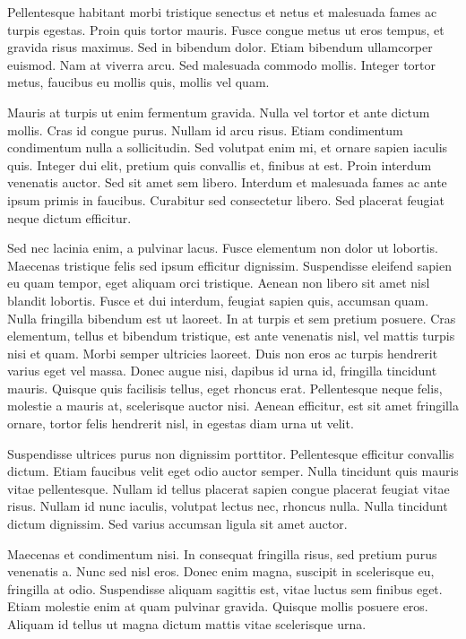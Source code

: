 Pellentesque habitant morbi tristique senectus et netus et malesuada fames ac turpis egestas. Proin quis tortor mauris. Fusce congue metus ut eros tempus, et gravida risus maximus. Sed in bibendum dolor. Etiam bibendum ullamcorper euismod. Nam at viverra arcu. Sed malesuada commodo mollis. Integer tortor metus, faucibus eu mollis quis, mollis vel quam.

Mauris at turpis ut enim fermentum gravida. Nulla vel tortor et ante dictum mollis. Cras id congue purus. Nullam id arcu risus. Etiam condimentum condimentum nulla a sollicitudin. Sed volutpat enim mi, et ornare sapien iaculis quis. Integer dui elit, pretium quis convallis et, finibus at est. Proin interdum venenatis auctor. Sed sit amet sem libero. Interdum et malesuada fames ac ante ipsum primis in faucibus. Curabitur sed consectetur libero. Sed placerat feugiat neque dictum efficitur.

Sed nec lacinia enim, a pulvinar lacus. Fusce elementum non dolor ut lobortis. Maecenas tristique felis sed ipsum efficitur dignissim. Suspendisse eleifend sapien eu quam tempor, eget aliquam orci tristique. Aenean non libero sit amet nisl blandit lobortis. Fusce et dui interdum, feugiat sapien quis, accumsan quam. Nulla fringilla bibendum est ut laoreet. In at turpis et sem pretium posuere. Cras elementum, tellus et bibendum tristique, est ante venenatis nisl, vel mattis turpis nisi et quam. Morbi semper ultricies laoreet. Duis non eros ac turpis hendrerit varius eget vel massa. Donec augue nisi, dapibus id urna id, fringilla tincidunt mauris. Quisque quis facilisis tellus, eget rhoncus erat. Pellentesque neque felis, molestie a mauris at, scelerisque auctor nisi. Aenean efficitur, est sit amet fringilla ornare, tortor felis hendrerit nisl, in egestas diam urna ut velit.

Suspendisse ultrices purus non dignissim porttitor. Pellentesque efficitur convallis dictum. Etiam faucibus velit eget odio auctor semper. Nulla tincidunt quis mauris vitae pellentesque. Nullam id tellus placerat sapien congue placerat feugiat vitae risus. Nullam id nunc iaculis, volutpat lectus nec, rhoncus nulla. Nulla tincidunt dictum dignissim. Sed varius accumsan ligula sit amet auctor.

Maecenas et condimentum nisi. In consequat fringilla risus, sed pretium purus venenatis a. Nunc sed nisl eros. Donec enim magna, suscipit in scelerisque eu, fringilla at odio. Suspendisse aliquam sagittis est, vitae luctus sem finibus eget. Etiam molestie enim at quam pulvinar gravida. Quisque mollis posuere eros. Aliquam id tellus ut magna dictum mattis vitae scelerisque urna.


